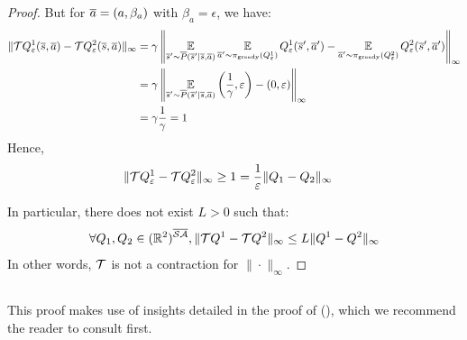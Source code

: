 \begin{proof}
But for $\overline{a}=(a,\beta_a)$ with $\beta_a = \epsilon$, we have:
\begin{align*}
    \|\mathcal{T} Q_\varepsilon^1(\overline{s}, \overline{a}) - \mathcal{T} Q_\varepsilon^2(\overline{s}, \overline{a})\|_\infty &= \gamma\left\|\operatorname*{\mathbb{E}}\limits_{\overline{s}'\sim\overline{P}(\overline{s}'|\overline{s},\overline{a})} \operatorname*{\mathbb{E}}\limits_{\overline{a}'\sim\pi_\text{greedy}(Q^1_\varepsilon)}Q^1_\varepsilon(\overline{s}',\overline{a}') - \operatorname*{\mathbb{E}}\limits_{\overline{a}'\sim\pi_\text{greedy}(Q^2_\varepsilon)}Q^2_\varepsilon(\overline{s}',\overline{a}')\right\|_\infty \\
    &= \gamma\left\|\operatorname*{\mathbb{E}}\limits_{\overline{s}'\sim\overline{P}(\overline{s}'|\overline{s},\overline{a})}\left(\frac{1}{\gamma}, \varepsilon\right) - (0, \varepsilon)\right\|_\infty \\
    &= \gamma\frac{1}{\gamma} = 1
\end{align*}
Hence, 
\begin{align*}
    \|\mathcal{T} Q_\varepsilon^1 - \mathcal{T} Q_\varepsilon^2\|_\infty &\geq 1 = \frac{1}{\varepsilon} \|Q_1-Q_2\|_\infty
\end{align*}

In particular, there does not exist $L>0$ such that:
$$\forall Q_1,Q_2\in(\mathbb{R}^2)^{\overline{\mathcal{S}}\overline{\mathcal{A}}}, \|\mathcal{T} Q^1 - \mathcal{T} Q^2\|_\infty \leq L \|Q^1 - Q^2\|_\infty$$
In other words, $\mathcal{T}$ is not a contraction for $\|\cdot\|_\infty$.
\end{proof}

\subsection{}
\label{proof:contraction-with-smooth}

\begin{remark*}
This proof makes use of insights detailed in the proof of  (), which we recommend the reader to consult first.
\end{remark*}


